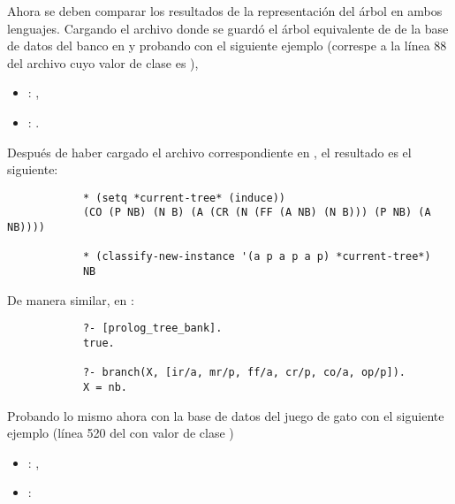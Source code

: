 \begin{itemize}
\begin{solution}
        Ahora se deben comparar los resultados de la representación del árbol en ambos lenguajes. Cargando el archivo donde se guardó el árbol equivalente de  de la base de datos del banco en  y probando con el siguiente ejemplo (correspe a la línea 88 del archivo  cuyo valor de clase es ),
        \begin{itemize}
            \item {}: ,
            \item {}: \code{[ir/a, mr/p, ff/a, cr/p, co/a, op/p]}.
        \end{itemize}
        Después de haber cargado el archivo correspondiente en , el resultado es el siguiente:
        \begin{verbatim}
            * (setq *current-tree* (induce))
            (CO (P NB) (N B) (A (CR (N (FF (A NB) (N B))) (P NB) (A NB))))

            * (classify-new-instance '(a p a p a p) *current-tree*)
            NB
        \end{verbatim}
        
        De manera similar, en :
        \begin{verbatim}
            ?- [prolog_tree_bank].
            true.

            ?- branch(X, [ir/a, mr/p, ff/a, cr/p, co/a, op/p]).
            X = nb.
        \end{verbatim}

        Probando lo mismo ahora con la base de datos del juego de gato con el siguiente ejemplo (línea 520 del con valor de clase )
        \begin{itemize}
            \item {}: ,
            \item {}: \code{[top-left/b, top-middle/x, top-right/o, middle-left/o, }
            

\end{itemize}
\end{solution}
\end{itemize}
